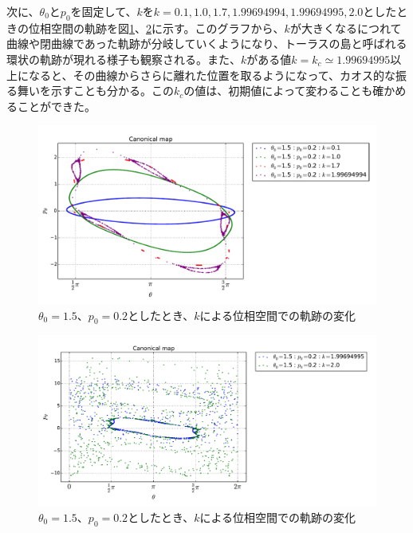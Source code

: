 \documentclass{jsarticle}
\begin{document}
\begin{enumerate}
\begin{enumerate}
                    次に、$\theta_{0}$と$p_{0}$を固定して、$k$を$k=0.1, 1.0, 1.7, 1.99694994, 1.99694995, 2.0$としたときの位相空間の軌跡を図\ref{fig:f3}、\ref{fig:f4}に示す。このグラフから、$k$が大きくなるにつれて曲線や閉曲線であった軌跡が分岐していくようになり、トーラスの島と呼ばれる環状の軌跡が現れる様子も観察される。また、$k$がある値$k=k_{c} \simeq 1.99694995$以上になると、その曲線からさらに離れた位置を取るようになって、カオス的な振る舞いを示すことも分かる。この$k_{c}$の値は、初期値によって変わることも確かめることができた。
                    \begin{figure}[H]
                        \begin{center}
                            \includegraphics[width=16.5cm]{figure_3.pdf}
                            \caption{$\theta_{0}=1.5$、$p_{0}=0.2$としたとき、$k$による位相空間での軌跡の変化}
                            \label{fig:f3}
                        \end{center}
                    \end{figure}
                    
                    \begin{figure}[H]
                        \begin{center}
                            \includegraphics[width=16.5cm]{figure_4.pdf}
                            \caption{$\theta_{0}=1.5$、$p_{0}=0.2$としたとき、$k$による位相空間での軌跡の変化}
                            \label{fig:f4}
                        \end{center}
                    \end{figure}
                    
                \end{enumerate}    
            
        \end{enumerate}
    
\end{document}

